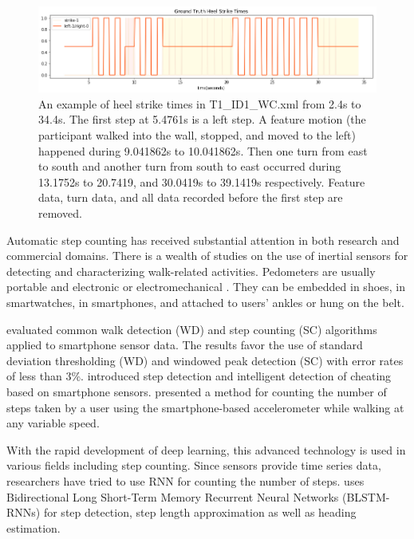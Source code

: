 \documentclass[11pt]{article}
\begin{document}
\begin{figure}[htb]
\centering
\includegraphics[scale=0.5]{ground_truth_2}
\caption{An example of heel strike times in T1\_ID1\_WC.xml from 2.4s to 34.4s. The first step at 5.4761s is a left step. A feature motion (the participant walked into the wall, stopped, and moved to the left) happened during 9.041862s to 10.041862s. Then one turn from east to south and another turn from south to east occurred during 13.1752s to 20.7419, and 30.0419s to 39.1419s respectively. Feature data, turn data, and all data recorded before the first step are removed.}
\label{fig:ground_truth}
\end{figure}


Automatic step counting has received substantial attention in both research and commercial domains. There is a wealth of studies on the use of inertial sensors for detecting and characterizing walk-related activities. Pedometers are usually portable and electronic or electromechanical \citep{wiki:pedometer}. They can be embedded in shoes, in smartwatches, in smartphones, and attached to users' ankles or hung on the belt.

\citep{brajdic2013walk} evaluated common walk detection (WD) and step counting (SC) algorithms applied to smartphone sensor data. The results favor the use of standard deviation thresholding (WD) and windowed peak detection (SC) with error rates of less than 3\%.
\citep{tomlein2012advanced} introduced step detection and intelligent detection of cheating based on smartphone sensors.
\citep{naqvib2012step} presented a method for counting the number of steps taken by a user using the smartphone-based accelerometer while walking at any variable speed.

With the rapid development of deep learning, this advanced technology is used in various fields including step counting. Since sensors provide time series data, researchers have tried to use RNN for counting the number of steps. \citep{edel2015advanced} uses Bidirectional Long Short-Term Memory Recurrent Neural Networks (BLSTM-RNNs) for step detection, step length approximation as well as heading estimation.
\end{document}
